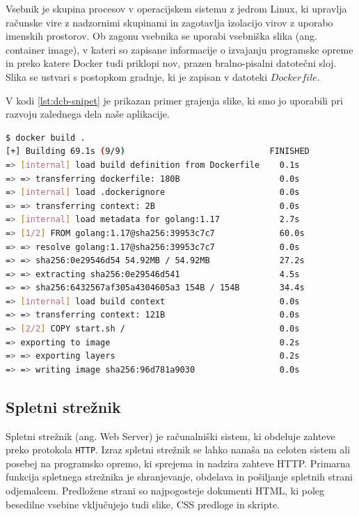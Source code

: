 \documentclass[a4paper, 12pt]{book}
\begin{document}
Vsebnik je skupina procesov v operacijskem sistemu z jedrom Linux, ki upravlja računske vire z nadzornimi skupinami in zagotavlja izolacijo virov z uporabo imenskih prostorov. Ob zagonu vsebnika se uporabi vsebniška slika (ang. container image), v kateri so zapisane informacije o izvajanju programske opreme in preko katere Docker tudi priklopi nov, prazen bralno-pisalni datotečni sloj. Slika se ustvari s postopkom gradnje, ki je zapisan v datoteki $Dockerfile$.

V kodi \ref{lst:dcb-snipet} je prikazan primer grajenja slike, ki smo jo uporabili pri razvoju zalednega dela naše aplikacije.
\begin{lstlisting}[language=bash, style=mystyle,caption={Grajenje slike Docker vmesnika.},label=lst:dcb-snipet]
$ docker build .
[+] Building 69.1s (9/9)                             FINISHED
=> [internal] load build definition from Dockerfile    0.1s
=> => transferring dockerfile: 180B                    0.0s
=> [internal] load .dockerignore                       0.0s
=> => transferring context: 2B                         0.0s
=> [internal] load metadata for golang:1.17            2.7s
=> [1/2] FROM golang:1.17@sha256:39953c7c7             60.0s
=> => resolve golang:1.17@sha256:39953c7c7             0.0s
=> => sha256:0e29546d54 54.92MB / 54.92MB              27.2s
=> => extracting sha256:0e29546d541                    4.5s
=> => sha256:6432567af305a4304605a3 154B / 154B        34.4s
=> [internal] load build context                       0.0s
=> => transferring context: 121B                       0.0s
=> [2/2] COPY start.sh /                               0.0s
=> exporting to image                                  0.2s
=> => exporting layers                                 0.2s
=> => writing image sha256:96d781a9030                 0.0s
\end{lstlisting}

\subsection{Spletni strežnik}

Spletni strežnik (ang. Web Server) je računalniški sistem, ki obdeluje zahteve preko protokola \verb=HTTP=. Izraz spletni strežnik se lahko nanaša na celoten sistem ali posebej na programsko opremo, ki sprejema in nadzira zahteve HTTP. Primarna funkcija spletnega strežnika je shranjevanje, obdelava in pošiljanje spletnih strani odjemalcem. Predložene strani so najpogosteje dokumenti HTML, ki poleg besedilne vsebine vključujejo tudi slike, CSS predloge in skripte.
\end{document}
